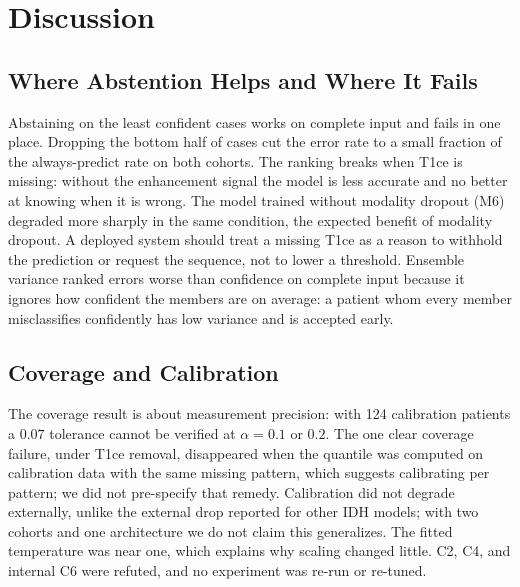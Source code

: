 \documentclass[conference]{IEEEtran}
\begin{document}
\section{Discussion}
\subsection{Where Abstention Helps and Where It Fails}
Abstaining on the least confident cases works on complete input and fails in one place. Dropping the bottom half of cases cut the error rate to a small fraction of the always-predict rate on both cohorts. The ranking breaks when T1ce is missing: without the enhancement signal the model is less accurate and no better at knowing when it is wrong. The model trained without modality dropout (M6) degraded more sharply in the same condition, the expected benefit of modality dropout. A deployed system should treat a missing T1ce as a reason to withhold the prediction or request the sequence, not to lower a threshold. Ensemble variance ranked errors worse than confidence on complete input because it ignores how confident the members are on average: a patient whom every member misclassifies confidently has low variance and is accepted early.

\subsection{Coverage and Calibration}
The coverage result is about measurement precision: with 124 calibration patients a $0.07$ tolerance cannot be verified at $\alpha=0.1$ or $0.2$. The one clear coverage failure, under T1ce removal, disappeared when the quantile was computed on calibration data with the same missing pattern, which suggests calibrating per pattern; we did not pre-specify that remedy. Calibration did not degrade externally, unlike the external drop reported for other IDH models; with two cohorts and one architecture we do not claim this generalizes. The fitted temperature was near one, which explains why scaling changed little. C2, C4, and internal C6 were refuted, and no experiment was re-run or re-tuned.
\end{document}
